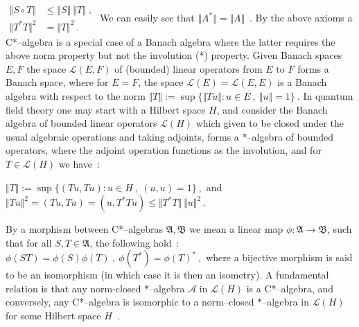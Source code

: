 \documentclass[12pt]{article}
\theoremstyle{plain}
\theoremstyle{definition}
\numberwithin{equation}{section}
\newcommand{\med}{\medbreak}
\newcommand{\lra}{{\longrightarrow}}
\begin{document}
$ \begin{aligned} \Vert S \circ T \Vert &\leq \Vert S \Vert ~ \Vert T \Vert~, \\ \Vert T^* T %
\Vert^2 & = \Vert T\Vert^2 ~. \end{aligned}$
\bigbreak
We can easily see that $\Vert A^* \Vert = \Vert A \Vert$~. By the above axioms a C*--algebra %
is a special case of a Banach algebra where the latter requires the above norm property but %
not the involution (*) property. Given Banach spaces $E, F$ the space $\mathcal L(E, F)$ of %
(bounded) linear operators from $E$ to $F$
forms a Banach space, where for $E=F$, the space $\mathcal L(E) = \mathcal L(E, E)$ is a %
Banach algebra with respect to the norm \bigbreak
$\Vert T \Vert := \sup\{ \Vert Tu \Vert : u \in E~,~ \Vert u \Vert= 1 \}~. $
\bigbreak
In quantum field theory one may start with a Hilbert space $H$, and consider the Banach %
algebra of bounded linear operators $\mathcal L(H)$ which given to be closed under the usual %
algebraic operations and taking adjoints, forms a $*$--algebra of bounded operators, where the %
adjoint operation functions as the involution, and for $T \in \mathcal L(H)$ we have~: 
\bigbreak

$ \Vert T \Vert := \sup\{ ( Tu , Tu): u \in H~,~ (u,u) = 1 \}~,$ and $ \Vert Tu \Vert^2 = (Tu, %
Tu) = (u, T^*Tu) \leq \Vert T^* T \Vert~ \Vert u \Vert^2~.$
\bigbreak


By a morphism between C*--algebras $\mathfrak A,\mathfrak B$ we mean a linear map $\phi : %
\mathfrak A \lra \mathfrak B$, such that for all $S, T \in \mathfrak A$, the following hold~: 
\bigbreak
$\phi(ST) = \phi(S) \phi(T)~,~ \phi(T^*) = \phi(T)^*~, $ 
\bigbreak
where a bijective morphism  is said to be an isomorphism (in which case it is then an %
isometry). A fundamental relation is that any norm-closed $*$--algebra $\mathcal A$ in %
$\mathcal L(H)$ is a C*--algebra, and conversely, any C*--algebra is isomorphic to a %
norm--closed $*$--algebra in $\mathcal L(H)$ for some Hilbert space $H$~.

\med
\end{document}
